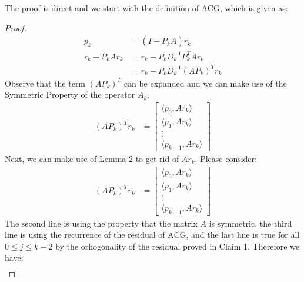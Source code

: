 \documentclass[]{article}
\theoremstyle{definition}
\begin{document}
            The proof is direct and we start with the definition of ACG, which is given as: 
            \begin{proof}
                \begin{align}
                    p_k &= (I - \overline{P}_kA)r_k
                    \\
                    r_k - \overline{P}_kAr_k &= 
                    r_k - P_kD^{-1}_kP^T_kAr_k
                    \\
                    &= r_k - P_kD^{-1}_k(AP_k)^Tr_k
                \end{align}
                Observe that the term $(AP_k)^{T}$ can be expanded and we can make use of the Symmetric Property of the operator $A_k$. 
                \begin{align}
                    (AP_k)^Tr_k &= 
                    \begin{bmatrix}
                        \langle p_0, Ar_k\rangle
                        \\
                        \langle p_1, Ar_k\rangle
                        \\
                        \vdots
                        \\
                        \langle p_{k - 1}, Ar_k\rangle
                    \end{bmatrix}
                \end{align}
                Next, we can make use of Lemma 2 to get rid of $Ar_k$. Please consider: 
                \begin{align}
                    (AP_k)^Tr_k &= 
                    \begin{bmatrix}
                        \langle p_0, Ar_k\rangle
                        \\
                        \langle p_1, Ar_k\rangle
                        \\
                        \vdots
                        \\
                        \langle p_{k - 1}, Ar_k\rangle
                    \end{bmatrix}
                \end{align}
                The second line is using the property that the matrix $A$ is symmetric, the third line is using the recurrence of the residual of ACG, and the last line is true for all $0 \le j \le k - 2$ by the orhogonality of the residual proved in Claim 1. Therefore we have: 
                \begin{align}

\end{align}
\end{proof}
\end{document}
